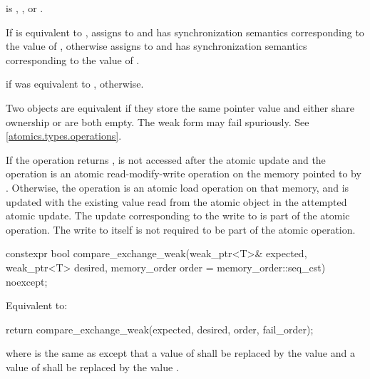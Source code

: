 \begin{itemdescr}
\pnum
\expects
{} is
,
, or
.

\pnum
\effects
If  is equivalent to ,
assigns  to  and
has synchronization semantics corresponding to the value of ,
otherwise assigns  to  and
has synchronization semantics corresponding to the value of .

\pnum
\returns
{} if  was equivalent to ,
 otherwise.

\pnum
\remarks
Two  objects are equivalent if
they store the same pointer value and
either share ownership or are both empty.
The weak form may fail spuriously. See \ref{atomics.types.operations}.

\pnum
If the operation returns ,
 is not accessed after the atomic update and
the operation is an atomic read-modify-write operation
on the memory pointed to by .
Otherwise, the operation is an atomic load operation on that memory, and
 is updated with the existing value
read from the atomic object in the attempted atomic update.
The  update corresponding to the write to 
is part of the atomic operation.
The write to  itself
is not required to be part of the atomic operation.
\end{itemdescr}

%
\begin{itemdecl}
constexpr bool compare_exchange_weak(weak_ptr<T>& expected, weak_ptr<T> desired,
                                     memory_order order = memory_order::seq_cst) noexcept;
\end{itemdecl}

\begin{itemdescr}
\pnum
\effects
Equivalent to:
\begin{codeblock}
return compare_exchange_weak(expected, desired, order, fail_order);
\end{codeblock}
where  is the same as 
except that a value of 
shall be replaced by the value  and
a value of 
shall be replaced by the value .
\end{itemdescr}

